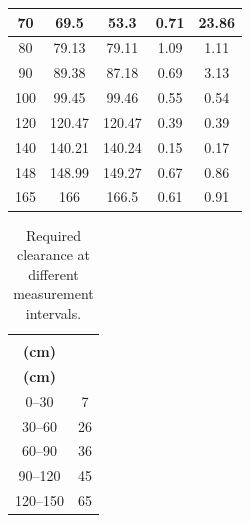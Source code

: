\documentclass[10pt, conference, compsocconf]{IEEEtran}
\begin{document}
\begin{table}[!t]
\begin{tabular}{|c|c|c|c|c|}
70 & 69.5 & 53.3 & 0.71 & 23.86 \\ \hline
80 & 79.13 & 79.11 & 1.09 & 1.11 \\ \hline
90 & 89.38 & 87.18 & 0.69 & 3.13 \\ \hline
100 & 99.45 & 99.46 & 0.55 & 0.54 \\ \hline
120 & 120.47 & 120.47 & 0.39 & 0.39 \\ \hline
140 & 140.21 & 140.24 & 0.15 & 0.17 \\ \hline
148 & 148.99 & 149.27 & 0.67 & 0.86 \\ \hline
165 & 166 & 166.5 & 0.61 & 0.91 \\ \hline
\end{tabular}
\end{table}

\begin{table}[!t]
\centering
\caption{Required clearance at different measurement intervals.}
\scriptsize
\setlength{\tabcolsep}{4pt}
\begin{tabular}{|c|c|}
\hline
\shortstack{\textbf{Distance range}\\\textbf{(cm)}} & \shortstack{\textbf{Required clearance}\\\textbf{(cm)}} \\ \hline
0--30 & 7 \\ \hline
30--60 & 26 \\ \hline
60--90 & 36 \\ \hline
90--120 & 45 \\ \hline
120--150 & 65 \\ \hline
\end{tabular}
\end{table}
\end{document}
